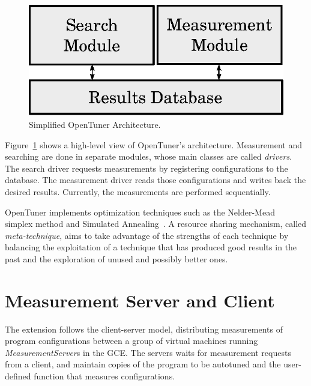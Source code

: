 \documentclass[a4paper, 12pt]{article}
\begin{document}
\begin{figure}[htpb]
    \centering
    \includegraphics[scale=.62]{opentuner-implementation}
    \caption{Simplified OpenTuner Architecture.}
    \label{fig:ot-imp}
\end{figure}

Figure~\ref{fig:ot-imp} shows a high-level view of OpenTuner's architecture.
Measurement and searching are done in separate modules, whose main classes are
called \emph{drivers}. The search driver requests measurements by registering
configurations to the database. The measurement driver reads those
configurations and writes back the desired results.  Currently, the
measurements are performed sequentially.

OpenTuner implements optimization techniques such as the
Nelder-Mead~\cite{nelder1965simplex} simplex method and Simulated
Annealing~\cite{kirkpatrick1983optimization}. A resource sharing mechanism,
called \emph{meta-technique}, aims to take advantage of the strengths of each
technique by balancing the exploitation of a technique that has produced good
results in the past and the exploration of unused and possibly better ones.


\section{Measurement Server and Client}
\label{sec:ext}

The extension follows the client-server model, distributing
measurements of program configurations between a group of virtual
machines running \emph{MeasurementServer}s in the GCE. The servers
waits for measurement requests from a client, and maintain copies
of the program to be autotuned and the user-defined function that
measures configurations.
\end{document}
